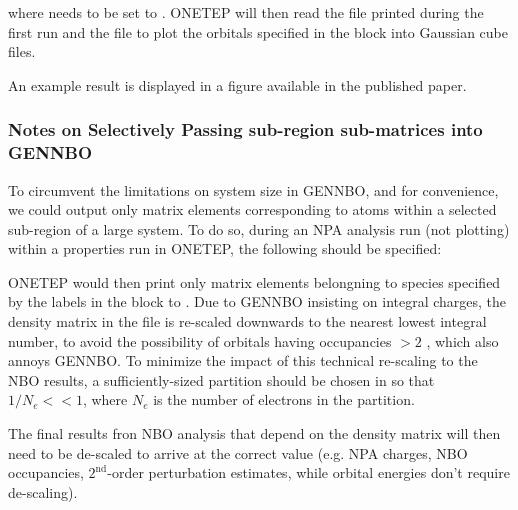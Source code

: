 \documentclass[letterpaper,10pt,english]{sphinxmanual}
\begin{document}
where  needs to be set to . ONETEP will then read the
 file printed during the first run and
the  file to plot the orbitals specified in the
 block into Gaussian cube files.

An example result is displayed in a figure available in the published
paper.


\subsubsection{Notes on Selectively Passing sub-region sub-matrices into GENNBO}
\label{\detokenize{nbo_onetep:notes-on-selectively-passing-sub-region-sub-matrices-into-gennbo}}
To circumvent the limitations on system size in GENNBO, and for
convenience, we could output only matrix elements corresponding to atoms
within a selected sub-region of a large system. To do so, during an NPA
analysis run (not plotting) within a properties run in ONETEP, the
following should be specified:
\begin{quote}

%
\begin{sphinxVerbatim}[commandchars=\\\{\}]
 
 
\end{sphinxVerbatim}
\end{quote}

ONETEP would then print only matrix elements belongning to species
specified by the labels in the  block to
. Due to GENNBO insisting on integral charges,
the density matrix in the  file is re-scaled downwards to the
nearest lowest integral number, to avoid the possibility of orbitals
having occupancies \(> 2\) , which also annoys GENNBO. To
minimize the impact of this technical re-scaling to the NBO results, a
sufficiently-sized partition should be chosen in
 so that \(1/N_e << 1\), where
\(N_e\) is the number of electrons in the partition.

The final results fron NBO analysis that depend on the density matrix
will then need to be de-scaled to arrive at the correct value (e.g. NPA
charges, NBO occupancies, \(2^{\mathrm{nd}}\)-order perturbation
estimates, while orbital energies don’t require de-scaling).
\end{document}
